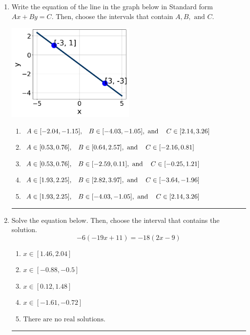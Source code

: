 \documentclass[14pt]{extbook}
\newcommand{\litem}[1]{\item#1\hspace*{-1cm}\rule{\textwidth}{0.4pt}}
\begin{document}
\begin{enumerate}
{\begin{enumerate}[label=\Alph*.]
\end{enumerate} }
\litem{
Write the equation of the line in the graph below in Standard form $Ax+By=C$. Then, choose the intervals that contain $A, B, \text{ and } C$.
\begin{center}
    \includegraphics[width=0.5\textwidth]{../Figures/linearGraphToStandardCopyB.png}
\end{center}
\begin{enumerate}[label=\Alph*.]
\item \( A \in [-2.04, -1.15], \hspace{3mm} B \in [-4.03, -1.05], \text{ and } \hspace{3mm} C \in [2.14, 3.26] \)
\item \( A \in [0.53, 0.76], \hspace{3mm} B \in [0.64, 2.57], \text{ and } \hspace{3mm} C \in [-2.16, 0.81] \)
\item \( A \in [0.53, 0.76], \hspace{3mm} B \in [-2.59, 0.11], \text{ and } \hspace{3mm} C \in [-0.25, 1.21] \)
\item \( A \in [1.93, 2.25], \hspace{3mm} B \in [2.82, 3.97], \text{ and } \hspace{3mm} C \in [-3.64, -1.96] \)
\item \( A \in [1.93, 2.25], \hspace{3mm} B \in [-4.03, -1.05], \text{ and } \hspace{3mm} C \in [2.14, 3.26] \)

\end{enumerate} }
\litem{
Solve the equation below. Then, choose the interval that contains the solution.\[ -6(-19x + 11) = -18(2x -9) \]\begin{enumerate}[label=\Alph*.]
\item \( x \in [1.46, 2.04] \)
\item \( x \in [-0.88, -0.5] \)
\item \( x \in [0.12, 1.48] \)
\item \( x \in [-1.61, -0.72] \)
\item \( \text{There are no real solutions.} \)


\end{enumerate}}
\end{enumerate}
\end{document}
